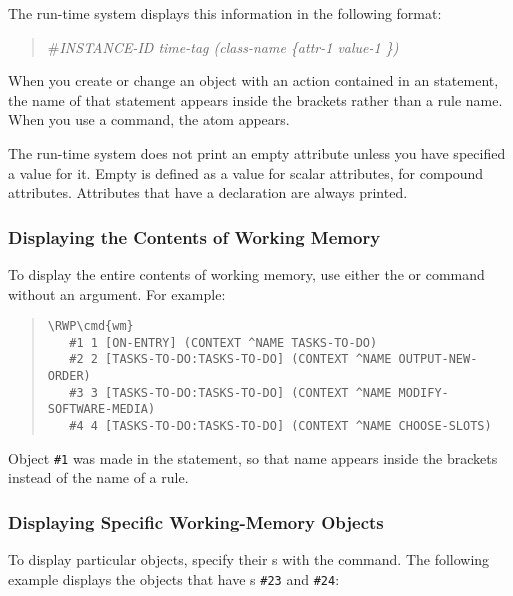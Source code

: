 The run-time system displays this information in the following format:

\begin{quote}
  \co\#\it{INSTANCE-ID} \it{time-tag} 
  \co(\it{class-name}  \{\it{attr-1}
  \it{value-1} \}\co)
\end{quote}

When you create or change an object with an action contained in an
 statement, the name of that statement appears inside the
brackets rather than a rule name. When you use a command, the atom
 appears.

The run-time system does not print an empty attribute unless you have
specified a  value for it. Empty is defined as a 
value for scalar attributes,  for compound attributes.
Attributes that have a  declaration are always printed.

\subsubsection{Displaying the Contents of Working Memory}

To display the entire contents of working memory, use either the
 or  command without an argument. For example:

\begin{quote}
\begin{Verbatim}[commandchars=\\\{\}]
\RWP\cmd{wm}
   #1 1 [ON-ENTRY] (CONTEXT ^NAME TASKS-TO-DO)
   #2 2 [TASKS-TO-DO:TASKS-TO-DO] (CONTEXT ^NAME OUTPUT-NEW-ORDER)
   #3 3 [TASKS-TO-DO:TASKS-TO-DO] (CONTEXT ^NAME MODIFY-SOFTWARE-MEDIA)
   #4 4 [TASKS-TO-DO:TASKS-TO-DO] (CONTEXT ^NAME CHOOSE-SLOTS)
\end{Verbatim}
\end{quote}

Object \verb|#1| was made in the  statement, so that name
appears inside the brackets instead of the name of a rule.

\subsubsection{Displaying Specific Working-Memory Objects}

To display particular objects, specify their s with
the  command. The following example displays the objects that
have s \verb|#23| and \verb|#24|:

